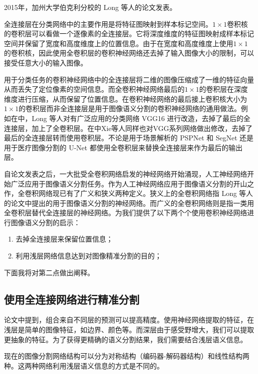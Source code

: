 2015年，加州大学伯克利分校的 Long 等人的论文\cite{long2015fully}发表。

全连接层在分类网络中的主要作用是将特征图映射到样本标记空间。$1\times 1$卷积核的卷积层可以看做一个逐像素的全连接层。它将深度维度的特征图映射成样本标记空间并保留了宽度和高度维度上的位置信息。由于在宽度和高度维度上使用$1\times 1$的卷积核，因此使用全卷积层的卷积神经网络还去掉了输入图像大小的限制，可以接受任意大小的输入图像。

用于分类任务的卷积神经网络中的全连接层将二维的图像压缩成了一维的特征向量从而丢失了定位像素的空间信息。而全卷积神经网络最后的$1\times 1$的卷积层在深度维度进行压缩，从而保留了位置信息。在卷积神经网络的最后接上卷积核大小为$1\times 1$的卷积层而非全连接层是用于图像语义分割的卷积神经网络的通用做法。例如在\cite{long2015fully}中，Long 等人对有广泛应用的分类网络 VGG16\cite{simonyan2014very} 进行改造，去掉了最后的全连接层，加上了全卷积层。在\cite{xie2015holistically}中Xie等人同样也对VGG系列网络做出修改，去掉了最后的全连接层转而使用卷积层。不论是用于场景解析的 PSPNet\cite{zhao2017pyramid} 和 SegNet\cite{badrinarayanan2017segnet} 还是用于医疗图像分割的 U-Net\cite{ronneberger2015u} 都使用全卷积层来替换全连接层来作为最后的输出层。

自论文\cite{long2015fully}发表之后，一大批受全卷积网络启发的神经网络开始涌现，人工神经网络开始广泛应用于图像语义分割任务。作为人工神经网络应用于图像语义分割的开山之作，全卷积网络现已有了广义和狭义两种定义。狭义上的全卷积网络指 Long 等人的论文\cite{long2015fully}中提出的用于图像语义分割的神经网络。而广义的全卷积网络则是指一类用全卷积层替代全连接层的神经网络。\cite{long2015fully}为我们提供了以下两个个使用卷积神经网络进行图像语义分割的启示：
\begin{enumerate}
    \item 去掉全连接层来保留位置信息；
    \item 利用浅层网络信息达到对图像精准分割的目的；
\end{enumerate}
下面我将对第二点做出阐释。

\subsection{使用全连接网络进行精准分割}
论文\cite{long2015fully}中提到，组合来自不同层的预测可以提高精度。使用神经网络提取的特征，在浅层是简单的图像特征，如边界、颜色等。而深层由于感受野增大，我们可以提取更抽象的特征。为了获得更精确的语义分割结果，我们需要结合浅层语义信息。

现在的图像分割网络结构可以分为对称结构（编码器-解码器结构）和线性结构两种。这两种网络利用浅层语义信息的方式是不同的。

